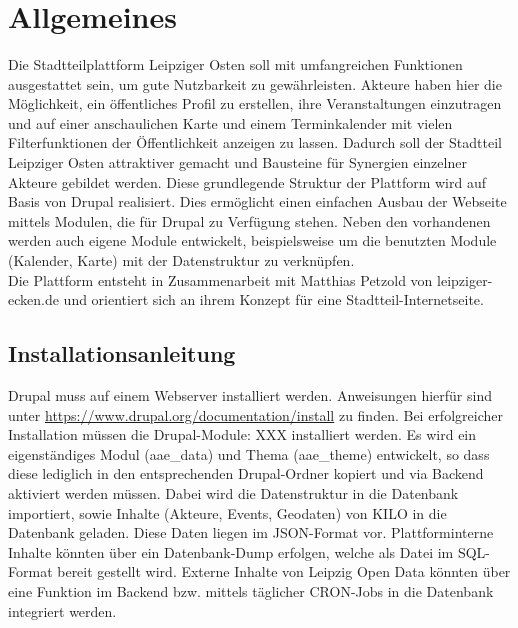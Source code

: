 \documentclass{swp}
\begin{document}
\\\\\\\\\\

\tableofcontents
\section{Allgemeines}
Die Stadtteilplattform Leipziger Osten soll mit umfangreichen Funktionen ausgestattet sein, um gute Nutzbarkeit zu gew\"ahrleisten. Akteure haben hier die M\"oglichkeit, ein \"offentliches Profil zu erstellen, ihre Veranstaltungen einzutragen und auf einer anschaulichen Karte und einem Terminkalender mit vielen Filterfunktionen der \"Offentlichkeit anzeigen zu lassen. Dadurch soll der Stadtteil Leipziger Osten attraktiver gemacht und Bausteine f\"ur Synergien einzelner Akteure gebildet werden. Diese grundlegende Struktur der Plattform wird auf Basis von Drupal realisiert. Dies erm\"oglicht einen einfachen Ausbau der Webseite mittels Modulen, die f\"ur Drupal zu Verf\"ugung stehen. Neben den vorhandenen werden auch eigene Module entwickelt, beispielsweise um die benutzten Module (Kalender, Karte) mit der Datenstruktur zu verkn\"upfen.\\
Die Plattform entsteht in Zusammenarbeit mit Matthias Petzold von leipziger-ecken.de und orientiert sich an ihrem Konzept f\"ur eine Stadtteil-Internetseite.
\subsection{Installationsanleitung}
Drupal muss auf einem Webserver installiert werden. Anweisungen hierf\"ur sind unter \url{https://www.drupal.org/documentation/install} zu finden. Bei erfolgreicher Installation m\"ussen die Drupal-Module: XXX installiert werden. Es wird ein eigenst\"andiges Modul (aae\_{}data) und Thema (aae\_{}theme) entwickelt, so dass diese lediglich in den entsprechenden Drupal-Ordner kopiert und via Backend aktiviert werden m\"ussen. Dabei wird die Datenstruktur in die Datenbank importiert, sowie Inhalte (Akteure, Events, Geodaten) von KILO in die Datenbank geladen. Diese Daten liegen im JSON-Format vor.  Plattforminterne Inhalte k\"onnten \"uber ein Datenbank-Dump erfolgen, welche als Datei im SQL-Format bereit gestellt wird. Externe Inhalte von Leipzig Open Data k\"onnten \"uber eine Funktion im Backend bzw. mittels t\"aglicher CRON-Jobs in die Datenbank integriert werden.
\end{document}
